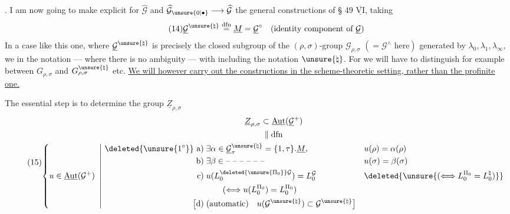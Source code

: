 . I am now going to make explicit for $\widehat{\mathcal G}$ and $\widehat{\mathcal G}_{\unsure{0|\bullet}}\longrightarrow\widehat{\mathcal G}$ the general constructions of § 49 $\overline{\underline{\mathrm{VI}}}$, taking  
\[
\tag{14}
\underline{\mathcal G}^{\unsure{\natural}}\overset{\mathrm{dfn}}=
\underline M=\underline{\mathcal G}^{\circ}
\quad(\text{identity component of }\underline{\mathcal G})
\]
In a case like this one, where $\underline{\mathcal G}^{\unsure{\natural}}$ is precisely the closed subgroup of the $(\rho,\sigma)$-group $\mathcal G_{\rho,\sigma}$ $(=\mathcal G^{\wedge}\text{ here})$ generated by $\lambda_0,\lambda_1,\lambda_\infty$, we  in the notation --- where there is no ambiguity --- with including the notation $\unsure{\natural}$. For  we will have to distinguish for example between $G_{\rho,\sigma}$ and $G_{\rho,\sigma}^{\unsure{\natural}}$ etc. \uline{We will however carry out the constructions in the scheme-theoretic setting, rather than the profinite one.}


The essential step is to determine the group $\underline Z_{\rho,\sigma}$
\[
\tag{15}
\begin{gathered}
\underline Z_{\rho,\sigma}\subset\underline{\operatorname{Aut}}(\underline{\mathcal G}^{+})\\
\Vert\;\mathrm{dfn}\\
\left\{u\in\underline{\operatorname{Aut}}(\mathcal G^{+})\ \left|\
\begin{aligned}
\deleted{\unsure{1^{\circ}}}\ \text{a)}\;&\exists\alpha\in\underline{\mathcal G}_{\tau}^{\unsure{\natural}}=\{1,\tau\}.\underline M,
&&u(\rho)=\alpha(\rho)\\
\text{b)}\;&\exists\beta\in\text{-- -- -- -- -- --}
&&u(\sigma)=\beta(\sigma)\\
\text{c)}\;&u(L_0^{\deleted{\unsure{\Pi_0}}\mathcal G})=L_0^{\mathcal G}
&&\deleted{\unsure{(\Longleftrightarrow L_0^{\Pi_0}=L_0^{\natural})}}\\
&\qquad(\Longleftrightarrow u(L_0^{\Pi_0})=L_0^{\Pi_0})\\
\bigl[\text{d)}\;&(\text{automatic})\quad u(\mathcal G^{\unsure{\natural}})\subset\mathcal G^{\unsure{\natural}}\bigr]
\end{aligned}\right.\right.
\end{gathered}
\]

